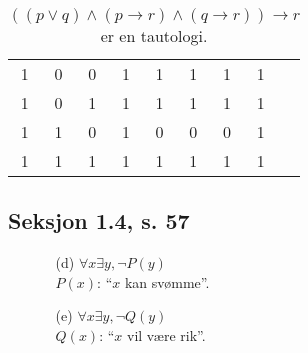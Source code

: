 \documentclass[a4paper, 12pt]{article}  %
\newcommand{\rarr}{\rightarrow}
\begin{document}
\begin{enumerate}
\begin{enumerate}
\begin{table}[h]
\begin{center}
\begin{tabular}{|c|c|c|c|c|c|c|c|c|}
                                1   & 0   & 0   & 1          & 1           & 1           & 1                                                & 1                                                          \\
                                1   & 0   & 1   & 1          & 1           & 1           & 1                                                & 1                                                          \\
                                1   & 1   & 0   & 1          & 0           & 0           & 0                                                & 1                                                          \\
                                1   & 1   & 1   & 1          & 1           & 1           & 1                                                & 1                                                          \\
                                \hline
                            \end{tabular}
                            \caption*{$((p \lor q) \land (p \rarr r) \land (q \rarr r)) \rarr r$ er en tautologi.}
                        \end{center}
                    \end{table}
          \end{enumerate}
\end{enumerate}
\newpage

\subsection*{Seksjon 1.4, s. 57}
\begin{enumerate}
    \item [\boxed{24}]
          \begin{enumerate}
              \item [(d)] $\forall x \exists y, \neg P(y)$ \\
                    $P(x)$: ``$x$ kan svømme''.
              \item [(e)] $\forall x \exists y, \neg Q(y)$ \\
                    $Q(x)$: ``$x$ vil være rik''.
          \end{enumerate}
\end{enumerate}
\end{document}
